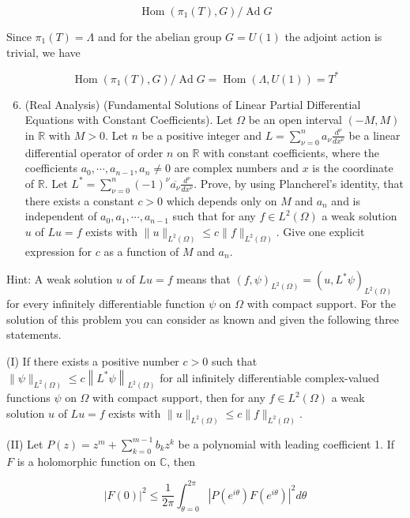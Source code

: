 \documentclass[10pt]{article}
\begin{document}
$$
\operatorname{Hom}\left(\pi_{1}(T), G\right) / \operatorname{Ad} G
$$

Since $\pi_{1}(T)=\Lambda$ and for the abelian group $G=U(1)$ the adjoint action is trivial, we have

$$
\operatorname{Hom}\left(\pi_{1}(T), G\right) / \operatorname{Ad} G=\operatorname{Hom}(\Lambda, U(1))=T^{*}
$$

\begin{enumerate}
  \setcounter{enumi}{5}
  \item (Real Analysis) (Fundamental Solutions of Linear Partial Differential Equations with Constant Coefficients). Let $\Omega$ be an open interval $(-M, M)$ in $\mathbb{R}$ with $M>0$. Let $n$ be a positive integer and $L=\sum_{\nu=0}^{n} a_{\nu} \frac{d^{\nu}}{d x^{\nu}}$ be a linear differential operator of order $n$ on $\mathbb{R}$ with constant coefficients, where the coefficients $a_{0}, \cdots, a_{n-1}, a_{n} \neq 0$ are complex numbers and $x$ is the coordinate of $\mathbb{R}$. Let $L^{*}=\sum_{\nu=0}^{n}(-1)^{\nu} \overline{a_{\nu}} \frac{d^{\nu}}{d x^{\nu}}$. Prove, by using Plancherel's identity, that there exists a constant $c>0$ which depends only on $M$ and $a_{n}$ and is independent of $a_{0}, a_{1}, \cdots, a_{n-1}$ such that for any $f \in L^{2}(\Omega)$ a weak solution $u$ of $L u=f$ exists with $\|u\|_{L^{2}(\Omega)} \leq c\|f\|_{L^{2}(\Omega)}$. Give one explicit expression for $c$ as a function of $M$ and $a_{n}$.
\end{enumerate}

Hint: A weak solution $u$ of $L u=f$ means that $(f, \psi)_{L^{2}(\Omega)}=\left(u, L^{*} \psi\right)_{L^{2}(\Omega)}$ for every infinitely differentiable function $\psi$ on $\Omega$ with compact support. For the solution of this problem you can consider as known and given the following three statements.

(I) If there exists a positive number $c>0$ such that $\|\psi\|_{L^{2}(\Omega)} \leq c\left\|L^{*} \psi\right\|_{L^{2}(\Omega)}$ for all infinitely differentiable complex-valued functions $\psi$ on $\Omega$ with compact support, then for any $f \in L^{2}(\Omega)$ a weak solution $u$ of $L u=f$ exists with $\|u\|_{L^{2}(\Omega)} \leq c\|f\|_{L^{2}(\Omega)}$.

(II) Let $P(z)=z^{m}+\sum_{k=0}^{m-1} b_{k} z^{k}$ be a polynomial with leading coefficient 1. If $F$ is a holomorphic function on $\mathbb{C}$, then

$$
|F(0)|^{2} \leq \frac{1}{2 \pi} \int_{\theta=0}^{2 \pi}\left|P\left(e^{i \theta}\right) F\left(e^{i \theta}\right)\right|^{2} d \theta
$$
\end{document}
